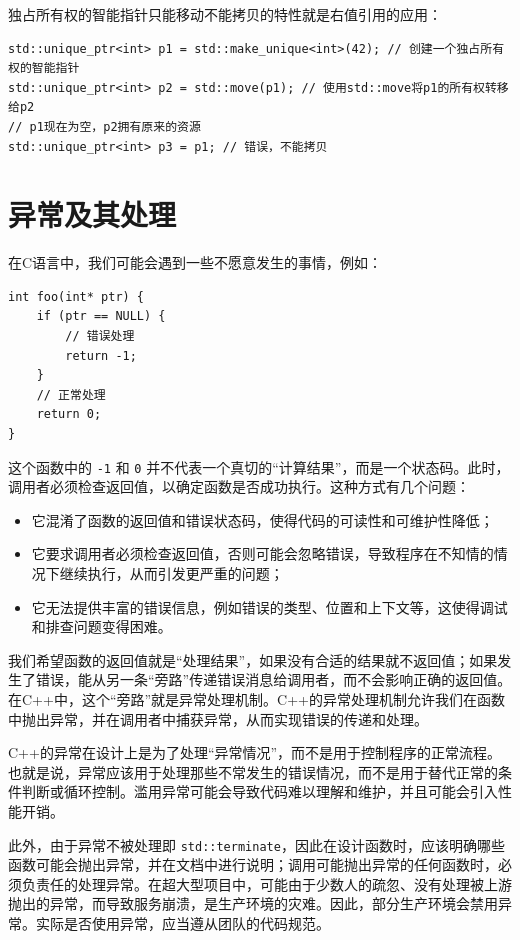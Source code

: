 独占所有权的智能指针只能移动不能拷贝的特性就是右值引用的应用：
\begin{verbatim}
std::unique_ptr<int> p1 = std::make_unique<int>(42); // 创建一个独占所有权的智能指针
std::unique_ptr<int> p2 = std::move(p1); // 使用std::move将p1的所有权转移给p2
// p1现在为空，p2拥有原来的资源
std::unique_ptr<int> p3 = p1; // 错误，不能拷贝
\end{verbatim}

\section{异常及其处理}

在C语言中，我们可能会遇到一些不愿意发生的事情，例如：
\begin{verbatim}
int foo(int* ptr) {
    if (ptr == NULL) {
        // 错误处理
        return -1;
    }
    // 正常处理
    return 0;
}
\end{verbatim}
这个函数中的 \verb|-1| 和 \verb|0| 并不代表一个真切的“计算结果”，而是一个状态码。此时，调用者必须检查返回值，以确定函数是否成功执行。这种方式有几个问题：
\begin{itemize}
    \item 它混淆了函数的返回值和错误状态码，使得代码的可读性和可维护性降低；
    \item 它要求调用者必须检查返回值，否则可能会忽略错误，导致程序在不知情的情况下继续执行，从而引发更严重的问题；
    \item 它无法提供丰富的错误信息，例如错误的类型、位置和上下文等，这使得调试和排查问题变得困难。
\end{itemize}

我们希望函数的返回值就是“处理结果”，如果没有合适的结果就不返回值；如果发生了错误，能从另一条“旁路”传递错误消息给调用者，而不会影响正确的返回值。在C++中，这个“旁路”就是异常处理机制。C++的异常处理机制允许我们在函数中抛出异常，并在调用者中捕获异常，从而实现错误的传递和处理。

\begin{remark}{}
    C++的异常在设计上是为了处理“异常情况”，而不是用于控制程序的正常流程。也就是说，异常应该用于处理那些不常发生的错误情况，而不是用于替代正常的条件判断或循环控制。滥用异常可能会导致代码难以理解和维护，并且可能会引入性能开销。

    此外，由于异常不被处理即 \verb|std::terminate|，因此在设计函数时，应该明确哪些函数可能会抛出异常，并在文档中进行说明；调用可能抛出异常的任何函数时，必须负责任的处理异常。在超大型项目中，可能由于少数人的疏忽、没有处理被上游抛出的异常，而导致服务崩溃，是生产环境的灾难。因此，部分生产环境会禁用异常。实际是否使用异常，应当遵从团队的代码规范。
\end{remark}

